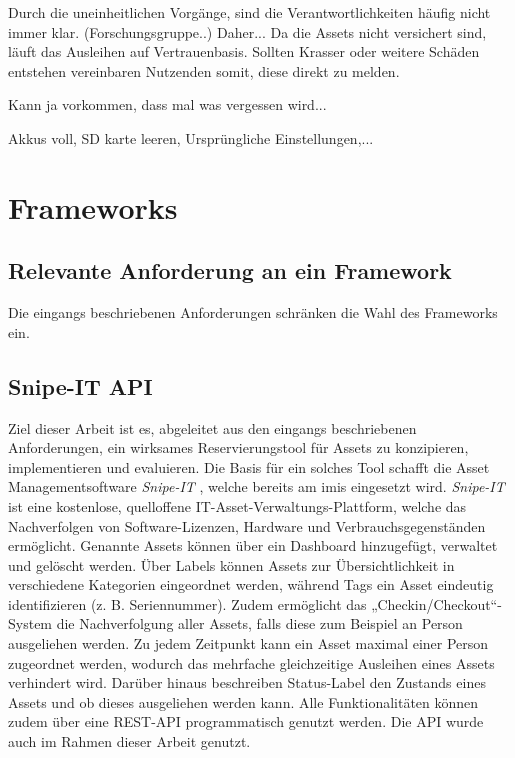 Durch die uneinheitlichen Vorgänge, sind die Verantwortlichkeiten häufig nicht immer klar.
(Forschungsgruppe..) Daher... Da die Assets nicht versichert sind, läuft das Ausleihen auf
Vertrauenbasis. Sollten Krasser oder weitere Schäden entstehen vereinbaren Nutzenden somit, diese
direkt zu melden.


Kann ja vorkommen, dass mal was vergessen wird...

Akkus voll, SD karte leeren, Ursprüngliche Einstellungen,...


\section{Frameworks}

\subsection{Relevante Anforderung an ein Framework}
Die eingangs beschriebenen Anforderungen schränken die Wahl des Frameworks ein.


\subsection{Snipe-IT API}
Ziel dieser Arbeit ist es, abgeleitet aus den eingangs beschriebenen Anforderungen, ein wirksames
Reservierungstool für Assets zu konzipieren, implementieren und evaluieren. Die Basis für ein
solches Tool schafft die Asset Managementsoftware \textit{Snipe-IT} \cite{noauthor_home_nodate},
welche bereits am \ac{imis} eingesetzt wird. \textit{Snipe-IT} ist eine kostenlose, quelloffene
IT-Asset-Verwaltungs-Plattform, welche das Nachverfolgen von Software-Lizenzen, Hardware und
Verbrauchsgegenständen ermöglicht. Genannte Assets können über ein Dashboard hinzugefügt, verwaltet
und gelöscht werden. Über Labels können Assets zur Übersichtlichkeit in verschiedene Kategorien
eingeordnet werden, während Tags ein Asset eindeutig identifizieren (z. B. Seriennummer). Zudem
ermöglicht das „Checkin/Checkout“-System die Nachverfolgung aller Assets, falls diese zum Beispiel
an Person ausgeliehen werden. Zu jedem Zeitpunkt kann ein Asset maximal einer Person zugeordnet
werden, wodurch das mehrfache gleichzeitige Ausleihen eines Assets verhindert wird. Darüber hinaus
beschreiben Status-Label den Zustands eines Assets und ob dieses ausgeliehen werden kann. Alle
Funktionalitäten können zudem über eine REST-API programmatisch genutzt werden. Die API wurde auch im
Rahmen dieser Arbeit genutzt.

